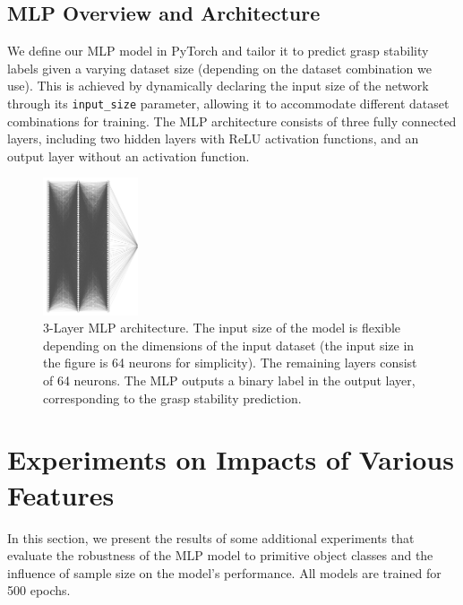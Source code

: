 \documentclass[11pt, a4paper]{report}
\begin{document}
\subsection{MLP Overview and Architecture}\label{sec:5.2.5}
We define our MLP model in PyTorch and tailor it to predict grasp stability labels given a varying dataset size (depending on the dataset combination we use). This is achieved by dynamically declaring the input size of the network through its \verb|input_size| parameter, allowing it to accommodate different dataset combinations for training. The MLP architecture consists of three fully connected layers, including two hidden layers with ReLU activation functions, and an output layer without an activation function.
\vspace{-0.2cm}
\begin{figure}[H]
    \centering
    \includegraphics[width=0.25\textwidth]{docs/Project Report/Media/5_2_5_mlp_architecture.png}
    \caption{3-Layer MLP architecture. The input size of the model is flexible depending on the dimensions of the input dataset (the input size in the figure is 64 neurons for simplicity). The remaining layers consist of 64 neurons. The MLP outputs a binary label in the output layer, corresponding to the grasp stability prediction.}
    \label{fig:5.3}
\end{figure}


\section{Experiments on Impacts of Various Features}\label{sec:5.3}
In this section, we present the results of some additional experiments that evaluate the robustness of the MLP model to primitive object classes and the influence of sample size on the model's performance. All models are trained for 500 epochs.
\end{document}

